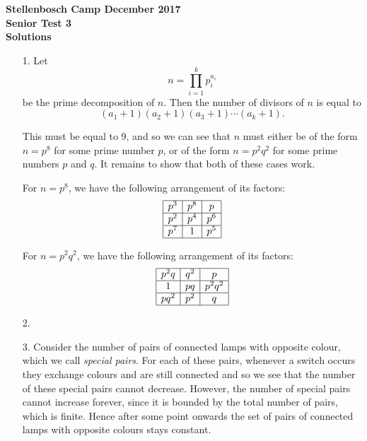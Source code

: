\documentclass[a4paper, 12pt]{article}
\begin{document}
\begin{center}
\textbf{Stellenbosch Camp December 2017 \\ Senior Test 3} \\
\textbf{Solutions}
\end{center}

\begin{enumerate}

    \item[1.] Let
    \[
        n = \prod_{i=1}^{k} p_i^{a_i}
    \]
    be the prime decomposition of $n$. Then the number of divisors of $n$ is
    equal to
    \[
        (a_1 + 1)(a_2 + 1)(a_3 + 1) \cdots (a_k + 1).
    \]

    This must be equal to $9$, and so we can see that $n$ must either be of the
    form $n = p^8$ for some prime number $p$, or of the form $n = p^2 q^2$ for
    some prime numbers $p$ and $q$. It remains to show that both of these cases
    work.

    For $n = p^8$, we have the following arrangement of its factors:
    \[
        \begin{array}{|c|c|c|}
            \hline
            p^3 & p^8 & p \\
            \hline
            p^2 & p^4 & p^6 \\
            \hline
            p^7 & 1 & p^5 \\
            \hline
        \end{array}
    \]

    For $n = p^2 q^2$, we have the following arrangement of its factors:
    \[
        \begin{array}{|c|c|c|}
            \hline
            p^2 q & q^2 & p \\
            \hline
            1 & p q & p^2 q^2 \\
            \hline
            pq^2 & p^2 & q \\
            \hline
        \end{array}
    \]
    
    \item[2.] 
    
    
    \item[3.] Consider the number of pairs of connected lamps with opposite colour, which we call \emph{special pairs}. For each of these pairs, whenever a switch occurs they exchange colours and are still connected and so we see that the number of these special pairs cannot decrease. However, the number of special pairs cannot increase forever, since it is bounded by the total number of pairs, which is finite. Hence after some point onwards the set of pairs of connected lamps with opposite colours stays constant.
    

\end{enumerate}
\end{document}
